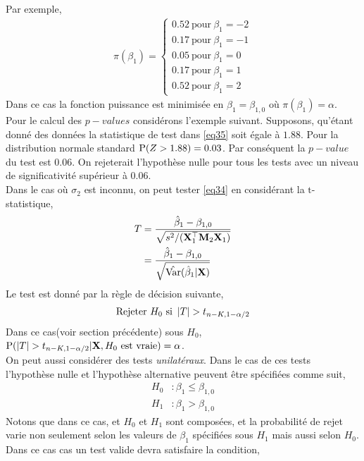 Par exemple,
\begin{align*}
\pi(\beta_1) =
\left\{
\begin{array}{c}
0.52 \ \textrm{pour} \ \beta_1 = -2\\
0.17 \ \textrm{pour} \ \beta_1 = -1\\
0.05 \ \textrm{pour} \ \beta_1 = 0\\
0.17 \ \textrm{pour} \ \beta_1 = 1\\
0.52 \ \textrm{pour} \ \beta_1 = 2
\end{array}
\right.
\end{align*}
Dans ce cas la fonction puissance est minimisée en $\beta_1 = \beta_{1,0}$ où $\pi(\beta_1) = \alpha$.\\
Pour le calcul des $p-values$ considérons l'exemple suivant. Supposons, qu'étant donné des données la statistique de test  dans \eqref{eq35} soit égale à $1.88$. Pour la distribution normale standard $\operatorname{P}(Z > 1.88) = 0.03$. Par conséquent la $p-value$ du test est $0.06$. On rejeterait l'hypothèse nulle pour tous les tests avec un niveau de significativité supérieur à $0.06$.\\
Dans le cas où $\sigma_2$ est inconnu, on peut tester \eqref{eq34} en considérant la 
$\mathrm{t}$-statistique,
\begin{align}
T&= \frac{\hat{\beta}_1 - \beta_{1,0}}{\sqrt{s^2/(\mathbf X_1^\top\mathbf M_2\mathbf X_1)}}\nonumber\\
&=\frac{\hat{\beta}_1 - \beta_{1,0}}{\sqrt{\hat{\operatorname{Var}}(\hat{\beta}_1 | \mathbf X)}}
\label{eq37}
\end{align}
Le test est donné par la règle de décision suivante,
\begin{align*}
\textrm{Rejeter} \ H_0 \ \textrm{si} \ \left\vert {T} \right\vert > t_{n-K, 1-\alpha/2}
\end{align*}
Dans ce cas(voir section précédente) sous $H_0$, $\operatorname{P}( \left\vert {T} \right\vert > t_{n-K, 1-\alpha/2} | \mathbf X, H_0 \ \textrm{est vraie}) = \alpha$.\\
On peut aussi considérer des tests \emph{unilatéraux}. Dans le cas de ces tests l'hypothèse nulle et l'hypothèse alternative peuvent être spécifiées comme suit,
\begin{align*}
H_0 &:  \beta_1 \leq \beta_{1,0}\\
H_1 &:  \beta_1 > \beta_{1,0}
\end{align*}
Notons que dans ce cas, et $H_0$ et $H_1$ sont composées, et la probabilité de rejet varie non seulement selon les valeurs de $\beta_1$ spécifiées sous $H_1$ mais aussi selon $H_0$. Dans ce cas cas un test valide devra satisfaire la condition,
